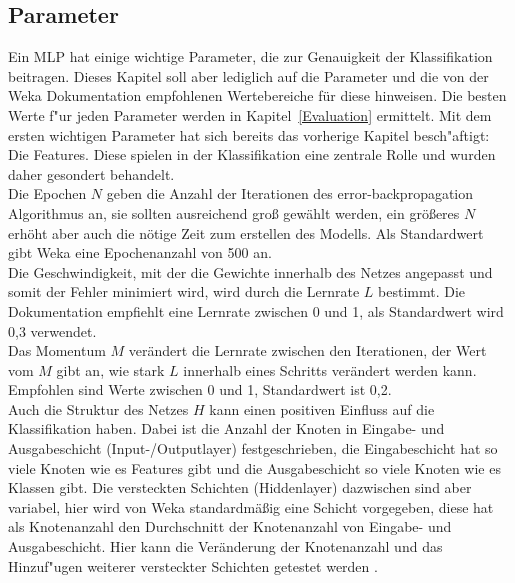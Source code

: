 \subsection{Parameter}
\label{Parameter}
Ein MLP hat einige wichtige Parameter, die zur Genauigkeit der Klassifikation beitragen. Dieses Kapitel soll aber lediglich auf die Parameter und die von der Weka Dokumentation \cite{WekaMLP}
empfohlenen Wertebereiche für diese hinweisen. Die besten Werte f"ur jeden Parameter werden in Kapitel~\ref{Evaluation} ermittelt. Mit dem ersten wichtigen Parameter hat sich bereits das vorherige Kapitel besch"aftigt: Die Features. Diese spielen in der Klassifikation eine zentrale Rolle und wurden daher gesondert behandelt.\\
Die Epochen $N$ geben die Anzahl der Iterationen des error-backpropagation Algorithmus an, sie sollten ausreichend groß gewählt werden, ein größeres $N$ erhöht aber auch die nötige Zeit zum erstellen des Modells. Als Standardwert gibt Weka eine Epochenanzahl von 500 an.\\ 
Die Geschwindigkeit, mit der die Gewichte innerhalb des Netzes angepasst und somit der Fehler minimiert wird, wird durch die Lernrate $L$ bestimmt. Die Dokumentation empfiehlt eine Lernrate zwischen 0 und 1, als Standardwert wird 0,3 verwendet.\\
Das Momentum $M$ verändert die Lernrate zwischen den Iterationen, der Wert vom $M$ gibt an, wie stark $L$ innerhalb eines Schritts verändert werden kann. Empfohlen sind Werte zwischen 0 und 1, Standardwert ist 0,2.\\
Auch die Struktur des Netzes $H$ kann einen positiven Einfluss auf die Klassifikation haben. Dabei ist die Anzahl der Knoten in  Eingabe- und Ausgabeschicht (Input-/Outputlayer) festgeschrieben, die Eingabeschicht hat so viele Knoten wie es Features gibt und die Ausgabeschicht so viele Knoten wie es Klassen gibt. Die versteckten Schichten (Hiddenlayer) dazwischen sind aber variabel, hier wird von Weka standardmäßig eine Schicht vorgegeben, diese hat als Knotenanzahl den Durchschnitt der Knotenanzahl von  Eingabe- und Ausgabeschicht. Hier kann die Veränderung der Knotenanzahl und das Hinzuf"ugen weiterer versteckter Schichten getestet werden \cite{kruse2011computational}.\\
